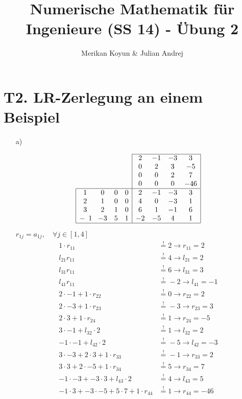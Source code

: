 \documentclass[11pt]{article}
\theoremstyle{plain}
\theoremstyle{definition}
\renewcommand{\u}{\"{u}}
\newcommand{\beequal}{\mathop{=}\limits^!}
\begin{document}
\title{Numerische Mathematik f\u r Ingenieure (SS 14) - \"{U}bung 2}
\author{Merikan Koyun \& Julian Andrej}
\maketitle

\section*{T2. LR-Zerlegung an einem Beispiel}
\begin{itemize}
\item[a)]

\begin{align}
\begin{array}{cccc|cccc|}
\cline{5-8}
 &  &  &         & 2  & -1 & -3 & 3   \\
 &  &  &         & 0  &  2 &  3 & -5  \\ 
 &  &  &         & 0  &  0 &  2 &  7  \\
 &  &  &         & 0  &  0 &  0 & -46 \\ \hline
\multicolumn{1}{|c}  1 & 0 & 0 & 0     & 2  & -1 & -3 & 3 \\
\multicolumn{1}{|c}  2 & 1 & 0 & 0    & 4  & 0 & -3 & 1   \\
\multicolumn{1}{|c}  3 & 2 & 1 & 0    & 6  & 1 & -1 & 6   \\
\multicolumn{1}{|c} -1 & -3 & 5 & 1  & -2  & -5 & 4 & 1   \\ \hline
\end{array}
\end{align}

$r_{1j} = a_{1j}, \quad \forall j\in[1,4]$
\begin{align}
1 \cdot r_{11}  &\beequal 2 \rightarrow r_{11}=2  \\ 
l_{21} r_{11}  &\beequal 4  \rightarrow l_{21}=2  \\
l_{31} r_{11}  &\beequal 6  \rightarrow l_{31}=3  \\
l_{41} r_{11}  &\beequal -2 \rightarrow l_{41}=-1 \\
2 \cdot -1 + 1 \cdot r_{22} &\beequal 0 \rightarrow r_{22} = 2 \\
2 \cdot -3 + 1 \cdot r_{23} &\beequal -3 \rightarrow r_{23} = 3 \\
2 \cdot 3  + 1 \cdot r_{24} &\beequal 1  \rightarrow r_{24} = -5 \\
3 \cdot -1 + l_{32} \cdot 2 &\beequal 1  \rightarrow l_{32} = 2 \\
-1 \cdot -1 + l_{42} \cdot 2 &\beequal -5 \rightarrow l_{42} = -3 \\
3 \cdot -3 + 2 \cdot 3 + 1 \cdot r_{33} &\beequal -1 \rightarrow r_{33} = 2 \\
3 \cdot 3 + 2 \cdot -5 + 1 \cdot r_{34} &\beequal 5 \rightarrow r_{34} = 7 \\
-1 \cdot -3 + -3 \cdot 3 + l_{43} \cdot 2 &\beequal 4 \rightarrow l_{43} = 5 \\
-1 \cdot 3 + -3 \cdot -5 + 5 \cdot 7 + 1 \cdot r_{44} &\beequal 1 \rightarrow r_{44}=-46
\end{align}



\end{itemize}
\end{document}
